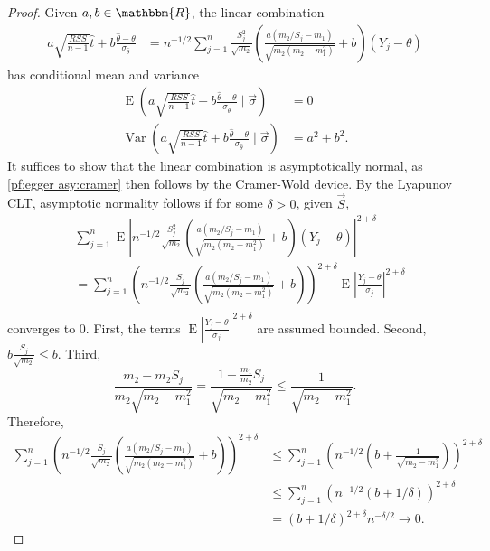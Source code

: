 \documentclass[12pt]{article}
\newcommand{\m}{m}
\newcommand{\s}{S}
\newcommand{\y}{Y}
\renewcommand{\t}{t}
\DeclareMathOperator{\E}{E}
\DeclareMathOperator{\var}{Var}
\begin{document}
\begin{proof}
  Given $a,b\in\mathbbm{R}$, the linear combination
  \begin{align}
    a\sqrt{\frac{RSS}{n-1}}\hat\t + b   \frac{\hat\theta-\theta}{\sigma_{\hat\theta}} &=                                                                             n^{-1/2}\sum_{j=1}^n \frac{\s_j^2}{\sqrt{\m_2}}
                                                                                        \left(\frac{a(\m_2/\s_j-\m_1)}{\sqrt{\m_2(\m_2-\m_1^2)}}+b\right)
                                                                                        (\y_j-\theta) 
  \end{align}
  has conditional mean and variance
  \begin{align}
    \E\left(    a\sqrt{\frac{RSS}{n-1}}\hat\t + b   \frac{\hat\theta-\theta}{\sigma_{\hat\theta}}\mid\vec\sigma\right) &= 0\\
    \var\left(    a\sqrt{\frac{RSS}{n-1}}\hat\t + b   \frac{\hat\theta-\theta}{\sigma_{\hat\theta}}\mid\vec\sigma\right) &= a^2+b^2.
  \end{align}
  It suffices to show that the linear combination is asymptotically normal, as \eqref{pf:egger asy:cramer} then follows by  the Cramer-Wold device. By the Lyapunov CLT, asymptotic normality follows if for some $\delta>0$, given $\vec\s$,
  \begin{align}
    &\sum_{j=1}^n \E\left|n^{-1/2}\frac{\s_j^2}{\sqrt{\m_2}}
      \left(\frac{a(\m_2/\s_j-\m_1)}{\sqrt{\m_2(\m_2-\m_1^2)}}+b\right)
    (\y_j-\theta) \right|^{2+\delta}\\
    &=\sum_{j=1}^n \left(n^{-1/2}\frac{\s_j}{\sqrt{\m_2}}
      \left(\frac{a(\m_2/\s_j-\m_1)}{\sqrt{\m_2(\m_2-\m_1^2)}}+b\right)\right)^{2+\delta}
    \E\left|\frac{\y_j-\theta}{\sigma_j} \right|^{2+\delta}\\
  \end{align}
  converges to $0$. First, the terms $\E\left|\frac{\y_j-\theta}{\sigma_j} \right|^{2+\delta}$ are assumed bounded. Second, $b\frac{\s_j}{\sqrt{\m_2}}\le b$. Third,
  $$
  \frac{\m_2-\m_2\s_j}{\m_2\sqrt{m_2-\m_1^2}}=\frac{1-\frac{\m_1}{\m_2}\s_j}{\sqrt{\m_2-\m_1^2}}\le\frac{1}{\sqrt{\m_2-\m_1^2}}.
  $$
  Therefore,
  \begin{align}
    \sum_{j=1}^n \left(n^{-1/2}\frac{\s_j}{\sqrt{\m_2}}
    \left(\frac{a(\m_2/\s_j-\m_1)}{\sqrt{\m_2(\m_2-\m_1^2)}}+b\right)\right)^{2+\delta} &\le \sum_{j=1}^n\left(n^{-1/2}\left(b+\frac{1}{\sqrt{\m_2-\m_1^2}}\right)\right)^{2+\delta}\\
                                                                                        &\le \sum_{j=1}^n(n^{-1/2}(b+1/\delta))^{2+\delta}\\
    &= (b+1/\delta)^{2+\delta}n^{-\delta/2}\to 0.
  \end{align}


\end{proof}
\end{document}
